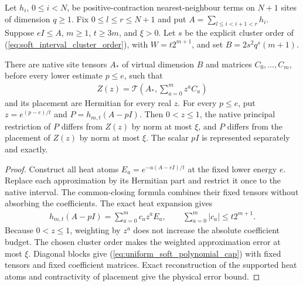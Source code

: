 \begin{lemma}
    \label{lem:uniform_native_soft_middle}
    \leanok
    Let $h_i$, $0\le i<N$, be positive-contraction nearest-neighbour
    terms on $N+1$ sites of dimension $q\ge1$. Fix $0\le l\le r\le N+1$
    and put $A=\sum_{l\le i<i+1<r}h_i$. Suppose $eI\le A$, $m\ge1$,
    $t\ge3m$, and $\xi>0$. Let $s$ be the explicit cluster order of
    (\ref{eq:soft_interval_cluster_order}), with $W=t2^{m+1}$, and set
    $B=2s^2q^s(m+1)$.

    There are native site tensors $A_*$ of virtual dimension $B$ and
    matrices $C_0,\ldots,C_m$, before every lower estimate $p\le e$,
    such that
    \begin{align}
        Z(z)=\mathcal T\!\left(A_*,\sum_{a=0}^m z^aC_a\right)
        \label{eq:uniform_soft_polynomial_cap}
    \end{align}
    and its placement are Hermitian for every real $z$.
    For every $p\le e$, put $z=e^{(p-e)/t}$ and
    $P=h_{m,t}(A-pI)$. Then $0<z\le1$, the native principal restriction
    of $P$ differs from $Z(z)$ by norm at most $\xi$, and $P$ differs
    from the placement of $Z(z)$ by norm at most $\xi$.
    The scalar $pI$ is represented separately and exactly.
\end{lemma}
\begin{proof}\leanok
    Construct all heat atoms $E_a=e^{-a(A-eI)/t}$ at the fixed lower
    energy $e$. Replace each approximation by its Hermitian part and
    restrict it once to the native interval. The common-closing formula
    combines their fixed tensors without absorbing the coefficients.
    The exact heat expansion gives
    \begin{align}
        h_{m,t}(A-pI)=\sum_{a=0}^m c_a z^aE_a,
        \qquad \sum_{a=0}^m|c_a|\le t2^{m+1}.
    \end{align}
    Because $0<z\le1$, weighting by $z^a$ does not increase the absolute
    coefficient budget. The chosen cluster order makes the weighted
    approximation error at most $\xi$. Diagonal blocks give
    (\ref{eq:uniform_soft_polynomial_cap}) with fixed tensors and fixed
    coefficient matrices. Exact reconstruction of the supported heat
    atoms and contractivity of placement give the physical error bound.
\end{proof}
